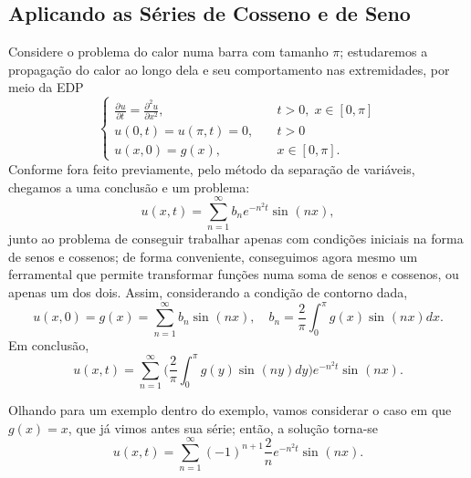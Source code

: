 \documentclass[../pde_notes.tex]{subfiles}
\begin{document}
\subsection{Aplicando as Séries de Cosseno e de Seno}
\begin{example}
	Considere o problema do calor numa barra com tamanho \(\pi \); estudaremos a propagação do calor ao longo dela e seu comportamento nas extremidades, por meio da EDP
	\[
		\left\{\begin{array}{ll}
			\frac{\partial^{}u}{\partial t^{}}=\frac{\partial^{2}u}{\partial x^{2}}, & \quad t>0,\; x\in[0, \pi ] \\
			u(0, t) = u(\pi , t) = 0,                                                & \quad t>0                  \\
			u(x, 0) = g(x),                                                          & \quad x\in [0, \pi ].
		\end{array}\right.
	\]
	Conforme fora feito previamente, pelo método da separação de variáveis, chegamos a uma conclusão e um problema:
	\[
		u(x, t) = \sum\limits_{n=1}^{\infty}b_{n}e^{-n^{2}t}\sin^{}{(nx)},
	\]
	junto ao problema de conseguir trabalhar apenas com condições iniciais na forma de senos e cossenos; de forma conveniente, conseguimos agora mesmo um ferramental que permite transformar funções numa soma de senos e cossenos, ou apenas um dos dois. Assim, considerando a condição de contorno dada,
	\[
		u(x, 0) = g(x) = \sum\limits_{n=1}^{\infty}b_{n}\sin^{}{(nx)},\quad b_{n}=\frac{2}{\pi }\int_{0}^{\pi }g(x)\sin^{}{(nx)}dx.
	\]
	Em conclusão,
	\[
		u(x, t) = \sum\limits_{n=1}^{\infty}\biggl(\frac{2}{\pi }\int_{0}^{\pi }g(y)\sin^{}{(ny)}dy\biggr)e^{-n^{2}t}\sin^{}{(nx)}.
	\]

	Olhando para um exemplo dentro do exemplo, vamos considerar o caso em que \(g(x)=x\), que já vimos antes sua série; então, a solução torna-se
	\[
		u(x, t) = \sum\limits_{n=1}^{\infty}(-1)^{n+1}\frac{2}{n}e^{-n^{2}t}\sin^{}{(nx)}.
	\]
\end{example}
\end{document}
